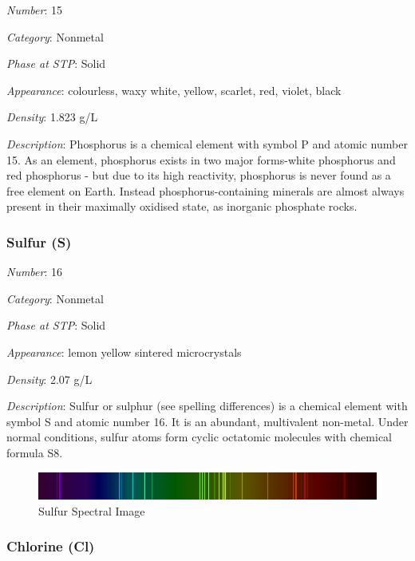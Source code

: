 \documentclass{article}
\begin{document}
\textit{Number}: 15

\textit{Category}: Nonmetal

\textit{Phase at STP}: Solid

\textit{Appearance}: colourless, waxy white, yellow, scarlet, red, violet, black

\textit{Density}: 1.823 g/L

\textit{Description}: Phosphorus is a chemical element with symbol P and atomic number 15. As an element, phosphorus exists in two major forms-white phosphorus and red phosphorus - but due to its high reactivity, phosphorus is never found as a free element on Earth. Instead phosphorus-containing minerals are almost always present in their maximally oxidised state, as inorganic phosphate rocks.

\hypertarget{subsubsection::S}{}\subsubsection{Sulfur (S)}

\textit{Number}: 16

\textit{Category}: Nonmetal

\textit{Phase at STP}: Solid

\textit{Appearance}: lemon yellow sintered microcrystals

\textit{Density}: 2.07 g/L

\textit{Description}: Sulfur or sulphur (see spelling differences) is a chemical element with symbol S and atomic number 16. It is an abundant, multivalent non-metal. Under normal conditions, sulfur atoms form cyclic octatomic molecules with chemical formula S8.

\immediate{}
\begin{figure}[!ht]
    \centering
    \includegraphics[width=12cm]{./resources/spectral_img/Sulfur_Spectrum.jpg}
    \caption{Sulfur Spectral Image}
\end{figure}

\hypertarget{subsubsection::Cl}{}\subsubsection{Chlorine (Cl)}
\end{document}
